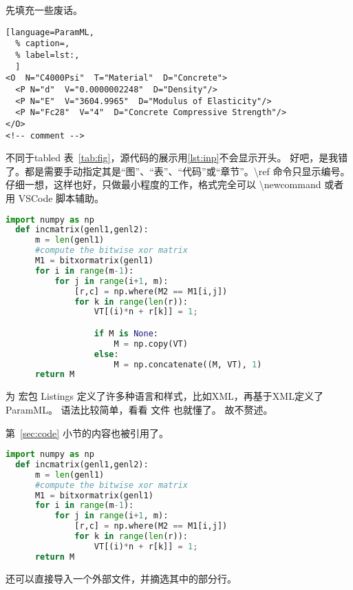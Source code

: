 \documentclass[../Main/thesis]{subfiles}
\begin{document}
先填充一些废话。\zhlipsum[8]

\begin{lstlisting}[language=ParamML,
  % caption=,
  % label=lst:,
  ]
<O  N="C4000Psi"  T="Material"  D="Concrete">
  <P N="d"  V="0.0000002248"  D="Density"/>
  <P N="E"  V="3604.9965"  D="Modulus of Elasticity"/>
  <P N="Fc28"  V="4"  D="Concrete Compressive Strength"/>
</O>
<!-- comment -->
\end{lstlisting}

不同于tabled 表~\ref{tab:fig}，源代码的展示用\ref{lst:inp}不会显示开头。
好吧，是我错了。都是需要手动指定其是“图”、“表”、“代码”或“章节”。\textbackslash ref 命令只显示编号。
仔细一想，这样也好，只做最小程度的工作，格式完全可以 \textbackslash newcommand 或者用 VSCode 脚本辅助。

\begin{lstlisting}[language=Python,
  caption=Second CODE Block,
  label=lst:2nd,
  style=colored]
  import numpy as np
  def incmatrix(genl1,genl2):
      m = len(genl1)
      #compute the bitwise xor matrix
      M1 = bitxormatrix(genl1)
      for i in range(m-1):
          for j in range(i+1, m):
              [r,c] = np.where(M2 == M1[i,j])
              for k in range(len(r)):
                  VT[(i)*n + r[k]] = 1;

                  if M is None:
                      M = np.copy(VT)
                  else:
                      M = np.concatenate((M, VT), 1)
      return M
\end{lstlisting}

为 宏包 Listings 定义了许多种语言和样式，比如XML，再基于XML定义了 ParamML。
语法比较简单，看看  文件 也就懂了。
故不赘述。

第~\ref{sec:code} 小节的内容也被引用了。

\begin{lstlisting}[language=Python,
  caption=中文标题没有括号,
  label=lst:outer,
  style=colorEX]
  import numpy as np
  def incmatrix(genl1,genl2):
      m = len(genl1)
      #compute the bitwise xor matrix
      M1 = bitxormatrix(genl1)
      for i in range(m-1):
          for j in range(i+1, m):
              [r,c] = np.where(M2 == M1[i,j])
              for k in range(len(r)):
                  VT[(i)*n + r[k]] = 1;
      return M
\end{lstlisting}

还可以直接导入一个外部文件，并摘选其中的部分行。


\end{document}
